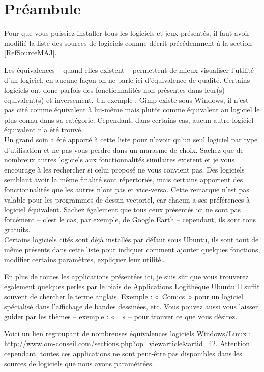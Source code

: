 \section{Préambule}
Pour que vous puissiez installer tous les logiciels et jeux présentés,  il faut avoir modifié la liste des sources de logiciels comme décrit précédemment à la section \ref{RefSourceMAJ}.\par
Les équivalences -- quand elles existent -- permettent de mieux visualiser l'utilité d'un logiciel, en aucune façon on ne parle ici d'équivalence de qualité. Certains logiciels ont donc parfois des fonctionnalités non présentes dans leur(s) équivalent(s) et inversement. Un exemple : Gimp existe sous Windows, il n'est pas cité comme équivalent à lui-même mais plutôt comme équivalent au logiciel le plus connu dans sa catégorie. Cependant, dans certains cas, aucun autre logiciel équivalent n'a été trouvé.\\
Un grand soin a été apporté à cette liste pour n'avoir qu'un seul logiciel par type d'utilisation et ne pas vous perdre dans un marasme de choix. Sachez que de nombreux autres logiciels aux fonctionnalités similaires existent et je vous encourage à les rechercher si celui proposé ne vous convient pas. Des logiciels semblant avoir la même finalité sont répertoriés, mais certains apportent des fonctionnalités que les autres n'ont pas et vice-versa. Cette remarque n'est pas valable pour les programmes de dessin vectoriel, car chacun a ses préférences à logiciel équivalent. Sachez également que tous ceux présentés ici ne sont pas forcément  -- c'est le cas, par exemple, de Google Earth -- cependant, ils sont tous gratuits.\\
Certains logiciels cités sont déjà installés par défaut sous Ubuntu, ils sont tout de même présents dans cette liste pour indiquer comment ajouter quelques fonctions, modifier certains paramètres, expliquer leur utilité\ldots{}\par
En plus de toutes les applications présentées ici, je suis sûr que vous trouverez également quelques perles par le biais de Applications \FlecheDroite Logithèque Ubuntu Il suffit souvent de chercher le terme anglais. Exemple : «~Comics~» pour un logiciel spécialisé dans l'affichage de bandes dessinées, etc. Vous pouvez aussi vous laisser guider par les thèmes -- exemple : «~~» -- pour trouver ce que vous désirez.\par
\begin{nota}
Voici un lien regroupant de nombreuses équivalences logiciels Windows/Linux : \\\url{http://www.om-conseil.com/sections.php?op=viewarticle&artid=42}. Attention cependant, toutes ces applications ne sont peut-être pas disponibles dans les sources de logiciels que nous avons paramétrées.
\end{nota}
